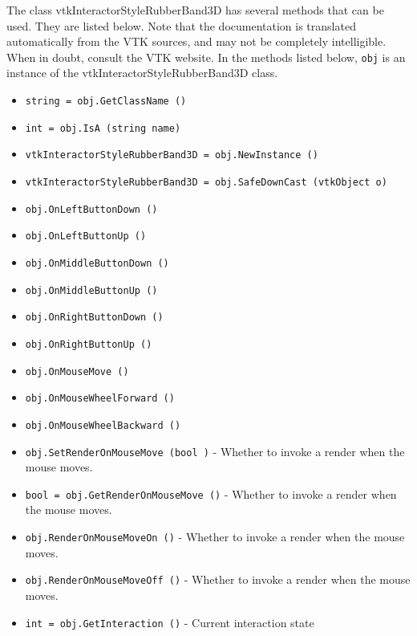 The class vtkInteractorStyleRubberBand3D has several methods that can be used.
  They are listed below.
Note that the documentation is translated automatically from the VTK sources,
and may not be completely intelligible.  When in doubt, consult the VTK website.
In the methods listed below, \verb|obj| is an instance of the vtkInteractorStyleRubberBand3D class.
\begin{itemize}
\item  \verb|string = obj.GetClassName ()|

\item  \verb|int = obj.IsA (string name)|

\item  \verb|vtkInteractorStyleRubberBand3D = obj.NewInstance ()|

\item  \verb|vtkInteractorStyleRubberBand3D = obj.SafeDownCast (vtkObject o)|

\item  \verb|obj.OnLeftButtonDown ()|

\item  \verb|obj.OnLeftButtonUp ()|

\item  \verb|obj.OnMiddleButtonDown ()|

\item  \verb|obj.OnMiddleButtonUp ()|

\item  \verb|obj.OnRightButtonDown ()|

\item  \verb|obj.OnRightButtonUp ()|

\item  \verb|obj.OnMouseMove ()|

\item  \verb|obj.OnMouseWheelForward ()|

\item  \verb|obj.OnMouseWheelBackward ()|

\item  \verb|obj.SetRenderOnMouseMove (bool )| -  Whether to invoke a render when the mouse moves.

\item  \verb|bool = obj.GetRenderOnMouseMove ()| -  Whether to invoke a render when the mouse moves.

\item  \verb|obj.RenderOnMouseMoveOn ()| -  Whether to invoke a render when the mouse moves.

\item  \verb|obj.RenderOnMouseMoveOff ()| -  Whether to invoke a render when the mouse moves.

\item  \verb|int = obj.GetInteraction ()| -  Current interaction state

\end{itemize}
